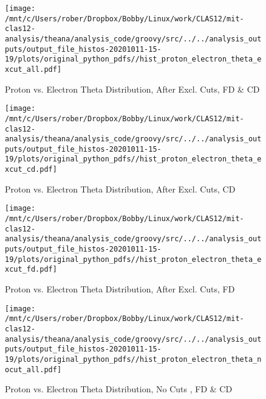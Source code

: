 \documentclass{article}
\begin{document}
\begin{landscape}
    \begin{figure}[h]
        \centering

        \texttt{[image: /mnt/c/Users/rober/Dropbox/Bobby/Linux/work/CLAS12/mit-clas12-analysis/theana/analysis\_code/groovy/src/../../analysis\_outputs/output\_file\_histos-20201011-15-19/plots/original\_python\_pdfs//hist\_proton\_electron\_theta\_excut\_all.pdf]}
        \captionsetup{textformat=empty,labelformat=blank}
        \caption{Proton vs. Electron Theta Distribution, After Excl. Cuts, FD \& CD}
    \end{figure}
    \clearpage
    
    \begin{figure}[h]
        \centering

        \texttt{[image: /mnt/c/Users/rober/Dropbox/Bobby/Linux/work/CLAS12/mit-clas12-analysis/theana/analysis\_code/groovy/src/../../analysis\_outputs/output\_file\_histos-20201011-15-19/plots/original\_python\_pdfs//hist\_proton\_electron\_theta\_excut\_cd.pdf]}
        \captionsetup{textformat=empty,labelformat=blank}
        \caption{Proton vs. Electron Theta Distribution, After Excl. Cuts, CD}
    \end{figure}
    \clearpage
    
    \begin{figure}[h]
        \centering

        \texttt{[image: /mnt/c/Users/rober/Dropbox/Bobby/Linux/work/CLAS12/mit-clas12-analysis/theana/analysis\_code/groovy/src/../../analysis\_outputs/output\_file\_histos-20201011-15-19/plots/original\_python\_pdfs//hist\_proton\_electron\_theta\_excut\_fd.pdf]}
        \captionsetup{textformat=empty,labelformat=blank}
        \caption{Proton vs. Electron Theta Distribution, After Excl. Cuts, FD}
    \end{figure}
    \clearpage
    
    \begin{figure}[h]
        \centering

        \texttt{[image: /mnt/c/Users/rober/Dropbox/Bobby/Linux/work/CLAS12/mit-clas12-analysis/theana/analysis\_code/groovy/src/../../analysis\_outputs/output\_file\_histos-20201011-15-19/plots/original\_python\_pdfs//hist\_proton\_electron\_theta\_nocut\_all.pdf]}
        \captionsetup{textformat=empty,labelformat=blank}
        \caption{Proton vs. Electron Theta Distribution, No Cuts , FD \& CD}
    \end{figure}
    \clearpage
    
    \begin{figure}[h]
        \centering


\end{figure}
\end{landscape}
\end{document}

